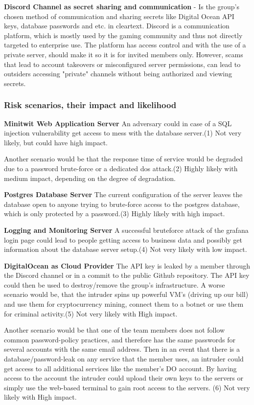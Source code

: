 \textbf{Discord Channel as secret sharing and communication} - Is the group's chosen method of communication and sharing secrets like Digital Ocean API keys, database passwords and etc. in cleartext. Discord is a communication platform, which is mostly used by the gaming community and thus not directly targeted to enterprise use. The platform has access control and with the use of a private server, should make it so it is for invited members only. However, scams\cite{discord_privacy} that lead to account takeovers or misconfigured server permissions, can lead to outsiders accessing "private" channels without being authorized and viewing secrets.


\subsubsection{Risk scenarios, their impact and likelihood}

\textbf{Minitwit Web Application Server}
An adversary could in case of a SQL injection vulnerability get access to mess with the database server.(1) Not very likely, but could have high impact.

Another scenario would be that the response time of service would be degraded due to a password brute-force or a dedicated \gls{dos} attack.(2) Highly likely with medium impact, depending on the degree of degradation. 


\textbf{Postgres Database Server}
The current configuration of the server leaves the database open to anyone trying to brute-force access to the postgres database, which is only protected by a password.(3) Highly likely with high impact.


\textbf{Logging and Monitoring Server}
A successful bruteforce attack of the grafana login page could lead to people getting access to business data and possibly get information about the database server setup.(4) Not very likely with low impact.


\textbf{DigitalOcean as Cloud Provider}
The API key is leaked by a member through the Discord channel or in a commit to the public Github repository. The API key could then be used to destroy/remove the group's infrastructure. A worse scenario would be, that the intruder spins up powerful VM's (driving up our bill) and use them for cryptocurrency mining, connect them to a botnet or use them for criminal activity.(5) Not very likely with High impact.

Another scenario would be that one of the team members does not follow common password-policy practices, and therefore has the same passwords for several accounts with the same email address. Then in an event that there is a database/password-leak on any service that the member uses, an intruder could get access to all additional services like the member's DO account. By having access to the account the intruder could upload their own keys to the servers or simply use the web-based terminal to gain root access to the servers. (6) Not very likely with High impact.

